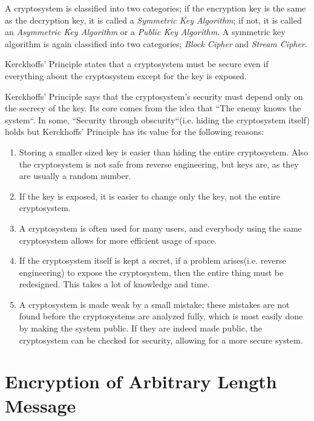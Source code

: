\documentclass{report}
\begin{document}
		A cryptosystem is classified into two categories; if the encryption key is the same as the decryption key, it is called a \emph{Symmetric Key Algorithm}; if not, it is called an \emph{Asymmetric Key Algorithm} or a \emph{Public Key Algorithm}. A symmetric key algorithm is again classified into two categories; \emph{Block Cipher} and \emph{Stream Cipher}.
		
		\begin{defn}
			Kerckhoffs' Principle states that a cryptosystem must be secure even if everything about the cryptosystem except for the key is exposed.
		\end{defn}
		Kerckhoffs' Principle says that the cryptosystem's security must depend only on the secrecy of the key. Its core comes from the idea that ``The enemy knows the system``. In some, ``Security through obscurity``(i.e. hiding the cryptosystem itself) holds but Kerckhoffs' Principle has its value for the following reasons:
		\begin{enumerate}
			\item Storing a smaller sized key is easier than hiding the entire cryptosystem. Also the cryptosystem is not safe from reverse engineering, but keys are, as they are usually a random number.
			\item If the key is exposed, it is easier to change only the key, not the entire cryptosystem.
			\item A cryptosystem is often used for many users, and everybody using the same cryptosystem allows for more efficient usage of space.
			\item If the cryptosystem itself is kept a secret, if a problem arises(i.e. reverse engineering) to expose the cryptosystem, then the entire thing must be redesigned. This takes a lot of knowledge and time.
			\item A cryptosystem is made weak by a small mistake; these mistakes are not found before the cryptosystems are analyzed fully, which is most easily done by making the system public. If they are indeed made public, the cryptosystem can be checked for security, allowing for a more secure system.
		\end{enumerate}
		
	\section{Encryption of Arbitrary Length Message}
\end{document}
